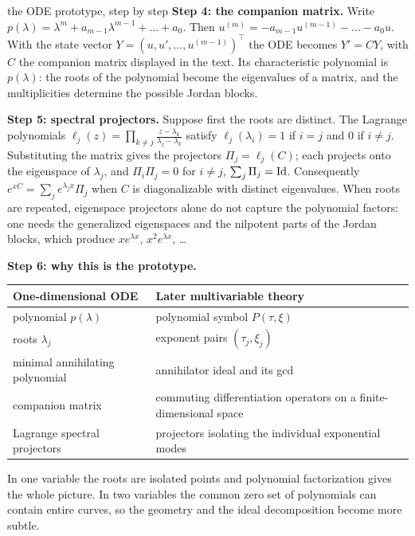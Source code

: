 \begin{explained}{the ODE prototype, step by step}
\medskip\textbf{Step 4: the companion matrix.} Write $p(\lambda)=\lambda^m+a_{m-1}\lambda^{m-1}+\dots+a_0$. Then $u^{(m)}=-a_{m-1}u^{(m-1)}-\dots-a_0u$. With the state vector $Y=(u,u',\dots,u^{(m-1)})^\top$ the ODE becomes $Y'=CY$, with $C$ the companion matrix displayed in the text. Its characteristic polynomial is $p(\lambda)$: the roots of the polynomial become the eigenvalues of a matrix, and the multiplicities determine the possible Jordan blocks.

\medskip\textbf{Step 5: spectral projectors.} Suppose first the roots are distinct. The Lagrange polynomials $\ell_j(z)=\prod_{k\ne j}\frac{z-\lambda_k}{\lambda_j-\lambda_k}$ satisfy $\ell_j(\lambda_i)=1$ if $i=j$ and $0$ if $i\ne j$. Substituting the matrix gives the projectors $\Pi_j=\ell_j(C)$; each projects onto the eigenspace of $\lambda_j$, and $\Pi_i\Pi_j=0$ for $i\ne j$, $\sum_j\Pi_j=\mathrm{Id}$. Consequently $e^{xC}=\sum_je^{\lambda_jx}\Pi_j$ when $C$ is diagonalizable with distinct eigenvalues. When roots are repeated, eigenspace projectors alone do not capture the polynomial factors: one needs the generalized eigenspaces and the nilpotent parts of the Jordan blocks, which produce $xe^{\lambda x}$, $x^2e^{\lambda x}$, \dots

\medskip\textbf{Step 6: why this is the prototype.}
\begin{center}\small
\begin{tabular}{@{}L{5.6cm}L{8.6cm}@{}}
\toprule
One-dimensional ODE & Later multivariable theory\\\midrule
polynomial $p(\lambda)$ & polynomial symbol $P(\tau,\xi)$\\
roots $\lambda_j$ & exponent pairs $(\tau_j,\xi_j)$\\
minimal annihilating polynomial & annihilator ideal and its gcd\\
companion matrix & commuting differentiation operators on a finite-dimensional space\\
Lagrange spectral projectors & projectors isolating the individual exponential modes\\
\bottomrule
\end{tabular}
\end{center}
In one variable the roots are isolated points and polynomial factorization gives the whole picture. In two variables the common zero set of polynomials can contain entire curves, so the geometry and the ideal decomposition become more subtle.
\end{explained}

